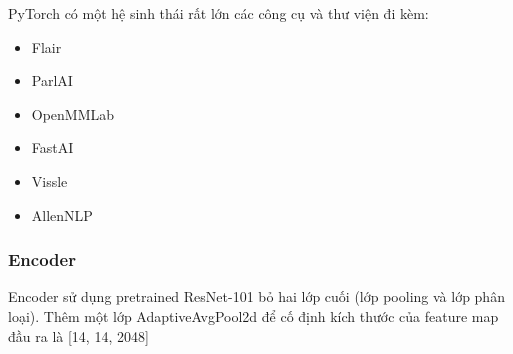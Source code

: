 \documentclass[14pt, a4paper]{article}
\numberwithin{equation}{section}
\numberwithin{algorithm}{section}
\numberwithin{figure}{section}
\numberwithin{dl}{section}
\numberwithin{md}{section}
\numberwithin{bd}{section}
\numberwithin{dn}{section}
\numberwithin{hq}{section}
\begin{document}
    PyTorch có một hệ sinh thái rất lớn các công cụ và thư viện đi kèm:
    \begin{itemize}
        \item Flair
        \item ParlAI
        \item OpenMMLab
        \item FastAI
        \item Vissle
        \item AllenNLP
    \end{itemize}

    \subsubsection{Encoder}

    Encoder sử dụng pretrained ResNet-101 bỏ hai lớp cuối (lớp pooling và lớp phân loại).
    Thêm một lớp AdaptiveAvgPool2d để cố định kích thước của feature map đầu ra là [14, 14, 2048]

    \newpage
    \printbibliography[title={TÀI LIỆU THAM KHẢO}]

\end{document}
